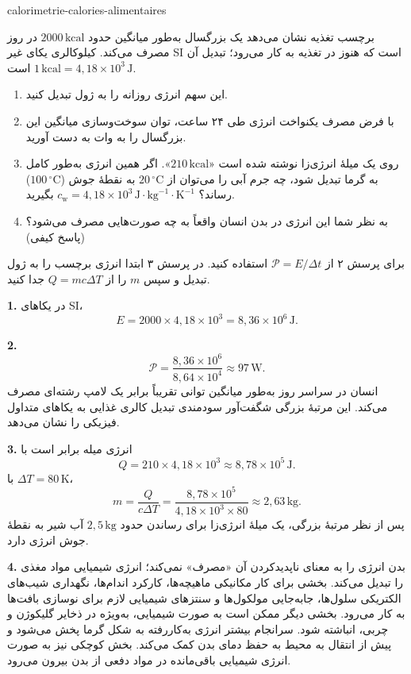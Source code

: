 \begin{exo}{calorimetrie-calories-alimentaires}

برچسب تغذیه نشان می‌دهد یک بزرگسال به‌طور میانگین حدود $2000\,\text{kcal}$ در روز مصرف می‌کند. کیلوکالری یکای غیر SI است که هنوز در تغذیه به کار می‌رود؛ تبدیل آن $1\,\text{kcal}=4{,}18\times10^3\,\text{J}$ است.

\begin{enumerate}
  \item این سهم انرژی روزانه را به ژول تبدیل کنید.
  \item با فرض مصرف یکنواخت انرژی طی ۲۴ ساعت، توان سوخت‌وسازی میانگین این بزرگسال را به وات به دست آورید.
  \item روی یک میلهٔ انرژی‌زا نوشته شده است «$210\,\text{kcal}$». اگر همین انرژی به‌طور کامل به گرما تبدیل شود، چه جرم آبی را می‌توان از $20\,{}^\circ\text{C}$ به نقطهٔ جوش ($100\,{}^\circ\text{C}$) رساند؟ $c_{\mathrm{w}}=4{,}18\times10^3\,\text{J}\!\cdot\!\text{kg}^{-1}\!\cdot\!\text{K}^{-1}$ بگیرید.
  \item به نظر شما این انرژی در بدن انسان واقعاً به چه صورت‌هایی مصرف می‌شود؟ (پاسخ کیفی)
\end{enumerate}

\begin{indication}
برای پرسش ۲ از $\mathcal P=E/\Delta t$ استفاده کنید. در پرسش ۳ ابتدا انرژی برچسب را به ژول تبدیل و سپس $m$ را از $Q=mc\Delta T$ جدا کنید.
\end{indication}

\begin{solution}
\textbf{1.} در یکاهای SI،
\[
E=2000\times4{,}18\times10^3=8{,}36\times10^6\,\text{J}.
\]

\textbf{2.}
\[
\mathcal P=\frac{8{,}36\times10^6}{8{,}64\times10^4}\approx97\,\text{W}.
\]
انسان در سراسر روز به‌طور میانگین توانی تقریباً برابر یک لامپ رشته‌ای مصرف می‌کند. این مرتبهٔ بزرگی شگفت‌آور سودمندی تبدیل کالری غذایی به یکاهای متداول فیزیکی را نشان می‌دهد.

\textbf{3.} انرژی میله برابر است با
\[
Q=210\times4{,}18\times10^3\approx8{,}78\times10^5\,\text{J}.
\]
با $\Delta T=80\,\text{K}$،
\[
m=\frac{Q}{c\Delta T}
=\frac{8{,}78\times10^5}{4{,}18\times10^3\times80}
\approx2{,}63\,\text{kg}.
\]
پس از نظر مرتبهٔ بزرگی، یک میلهٔ انرژی‌زا برای رساندن حدود $2{,}5\,\text{kg}$ آب شیر به نقطهٔ جوش انرژی دارد.

\textbf{4.} بدن انرژی را به معنای ناپدیدکردن آن «مصرف» نمی‌کند؛ انرژی شیمیایی مواد مغذی را تبدیل می‌کند. بخشی برای کار مکانیکی ماهیچه‌ها، کارکرد اندام‌ها، نگهداری شیب‌های الکتریکی سلول‌ها، جابه‌جایی مولکول‌ها و سنتزهای شیمیایی لازم برای نوسازی بافت‌ها به کار می‌رود. بخشی دیگر ممکن است به صورت شیمیایی، به‌ویژه در ذخایر گلیکوژن و چربی، انباشته شود. سرانجام بیشتر انرژی به‌کاررفته به شکل گرما پخش می‌شود و پیش از انتقال به محیط به حفظ دمای بدن کمک می‌کند. بخش کوچکی نیز به صورت انرژی شیمیایی باقی‌مانده در مواد دفعی از بدن بیرون می‌رود.
\end{solution}
\end{exo}
